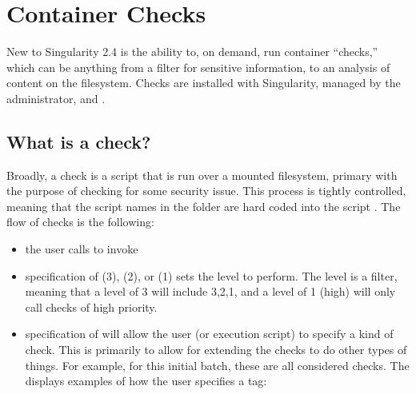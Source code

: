 \documentclass[letterpaper,10pt,english]{sphinxmanual}
\begin{document}
\chapter{Container Checks}
\label{\detokenize{container_checks:container-checks}}\label{\detokenize{container_checks::doc}}
New to Singularity 2.4 is the ability to, on demand, run container
“checks,” which can be anything from a filter for sensitive information,
to an analysis of content on the filesystem. Checks are installed with
Singularity, managed by the administrator, and .


\section{What is a check?}
\label{\detokenize{container_checks:what-is-a-check}}
Broadly, a check is a script that is run over a mounted filesystem,
primary with the purpose of checking for some security issue. This
process is tightly controlled, meaning that the script names in the
folder are hard coded into the script
.
The flow of checks is the following:
\begin{itemize}
\item {} 
the user calls  to invoke

\item {} 
specification of  (3),  (2), or  (1) sets the level to perform. The
level is a filter, meaning that a level of 3 will include 3,2,1, and
a level of 1 (high) will only call checks of high priority.

\item {} 
specification of  will allow the user (or execution script) to specify
a kind of check. This is primarily to allow for extending the checks
to do other types of things. For example, for this initial batch,
these are all considered  checks. The
displays examples of how the user specifies a tag:

\end{itemize}
\end{document}
